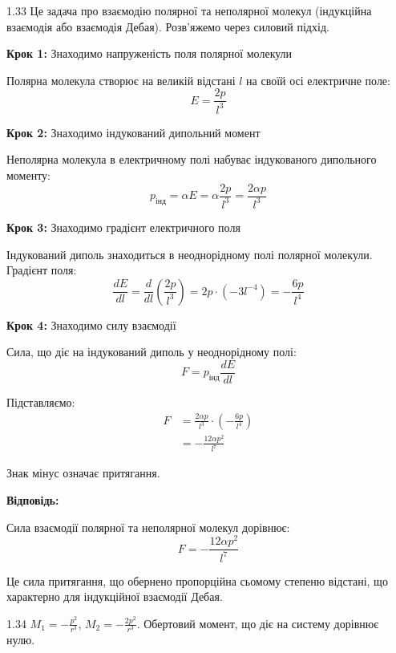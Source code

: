\begin{Solution}{1.{33}}
Це задача про взаємодію полярної та неполярної молекул (індукційна взаємодія або взаємодія Дебая). Розв'яжемо через силовий підхід.

\textbf{Крок 1:} Знаходимо напруженість поля полярної молекули

Полярна молекула створює на великій відстані $l$ на своїй осі електричне поле:
\begin{equation}
E = \frac{2p}{l^3}
\end{equation}

\textbf{Крок 2:} Знаходимо індукований дипольний момент

Неполярна молекула в електричному полі набуває індукованого дипольного моменту:
\begin{equation}
p_{\text{інд}} = \alpha E = \alpha \frac{2p}{l^3} = \frac{2\alpha p}{l^3}
\end{equation}

\textbf{Крок 3:} Знаходимо градієнт електричного поля

Індукований диполь знаходиться в неоднорідному полі полярної молекули. Градієнт поля:
\begin{equation}
\frac{dE}{dl} = \frac{d}{dl}\left(\frac{2p}{l^3}\right) = 2p \cdot (-3l^{-4}) = -\frac{6p}{l^4}
\end{equation}

\textbf{Крок 4:} Знаходимо силу взаємодії

Сила, що діє на індукований диполь у неоднорідному полі:
\begin{equation}
F = p_{\text{інд}} \frac{dE}{dl}
\end{equation}

Підставляємо:
\begin{align}
F &= \frac{2\alpha p}{l^3} \cdot \left(-\frac{6p}{l^4}\right) \\
&= -\frac{12\alpha p^2}{l^7}
\end{align}

Знак мінус означає притягання.

\textbf{Відповідь:}

Сила взаємодії полярної та неполярної молекул дорівнює:
\begin{equation}
F = -\frac{12\alpha p^2}{l^7}
\end{equation}

Це сила притягання, що обернено пропорційна сьомому степеню відстані, що характерно для індукційної взаємодії Дебая.
\end{Solution}
\begin{Solution}{1.{34}}
	$M_1 = -\frac{p^2}{r^3}$, $M_2 = -\frac{2p^2}{r^3}$. Обертовий момент, що діє на систему дорівнює нулю.
\end{Solution}
